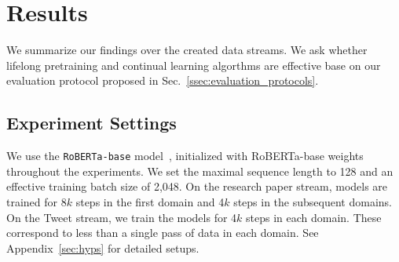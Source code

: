 
\section{Results}
We summarize our findings over the created data streams. We ask whether lifelong pretraining and continual learning algorthms are effective base on our evaluation protocol proposed in Sec.~\ref{ssec:evaluation_protocols}. 



\subsection{Experiment Settings}
We use the \texttt{RoBERTa-base} model~\cite{Liu2019RoBERTaAR}, initialized with RoBERTa-base weights throughout the experiments. We set the maximal sequence length to 128 and an effective training batch size of 2,048. On the research paper stream, models are trained for 8$k$ steps in the first domain and 4$k$ steps in the subsequent domains. On the Tweet stream, we train the models for 4$k$ steps in each domain. These correspond to less than a single pass of data in each domain. See Appendix~\ref{sec:hyps} for detailed setups. %


